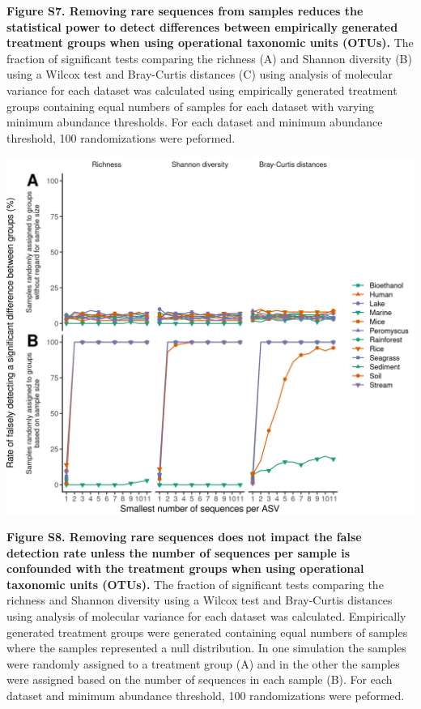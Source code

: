 \documentclass[
]{article}
\begin{document}
\textbf{Figure S7. Removing rare sequences from samples reduces the
statistical power to detect differences between empirically generated
treatment groups when using operational taxonomic units (OTUs).} The
fraction of significant tests comparing the richness (A) and Shannon
diversity (B) using a Wilcox test and Bray-Curtis distances (C) using
analysis of molecular variance for each dataset was calculated using
empirically generated treatment groups containing equal numbers of
samples for each dataset with varying minimum abundance thresholds. For
each dataset and minimum abundance threshold, 100 randomizations were
peformed.

\newpage

\includegraphics{figure_s8.png}

\textbf{Figure S8. Removing rare sequences does not impact the false
detection rate unless the number of sequences per sample is confounded
with the treatment groups when using operational taxonomic units
(OTUs).} The fraction of significant tests comparing the richness and
Shannon diversity using a Wilcox test and Bray-Curtis distances using
analysis of molecular variance for each dataset was calculated.
Empirically generated treatment groups were generated containing equal
numbers of samples where the samples represented a null distribution. In
one simulation the samples were randomly assigned to a treatment group
(A) and in the other the samples were assigned based on the number of
sequences in each sample (B). For each dataset and minimum abundance
threshold, 100 randomizations were peformed.
\end{document}
